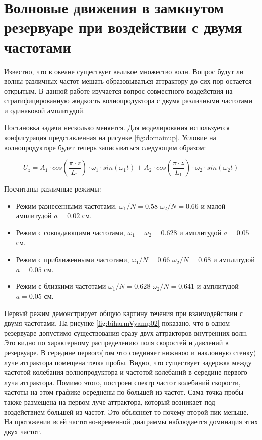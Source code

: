 \section{Волновые движения в замкнутом резервуаре при воздействии с двумя частотами}

Известно, что в океане существует великое множество волн. Вопрос будут ли волны различных частот мешать образовываться аттрактору до сих пор остается открытым. В данной работе изучается вопрос совместного воздействия на стратифицированную жидкость волнопродуктора с двумя различными частотами и одинаковой амплитудой. 

Постановка задачи несколько меняется. Для моделирования используется конфигурация представленная на рисунке \ref{fig:domainup}. Условие на волнопродукторе будет теперь записываться следующим образом:

\begin{equation}
    U_z = A_1\cdot cos\left(\frac{\pi \cdot z}{L_1}\right)\cdot \omega_1 \cdot  sin(\omega_1 t) + A_2\cdot cos\left(\frac{\pi \cdot z}{L_1}\right)\cdot \omega_2 \cdot  sin(\omega_2 t)
\end{equation}

Посчитаны различные режимы:

\begin{itemize}
    \item Режим разнесенными частотами, $\omega_1/N=0.58$ $\omega_2/N=0.66$ и малой амплитудой $a=0.02$ см. 
    \item Режим с совпадающими частотами, $\omega_1=\omega_2=0.628$ и амплитудой $a=0.05$ см.
    \item Режим с приближенными частотами, $\omega_1/N=0.66$ $\omega_2/N=0.68$ и амплитудой $a=0.05$ см.
    \item Режим с близкими частотами $\omega_1/N=0.628$ $\omega_2/N=0.641$ и  амплитудой $a=0.05$ см.
\end{itemize}

Первый режим демонстрирует общую картину течения при взаимодействии с двумя частотами. На рисунке \ref{fig:biharmVyamp02} показано, что в одном резервуаре допустимо существования сразу двух аттракторов внутренних волн. Это видно по характерному распределению поля скоростей и давлений в резервуаре. В середине первого(том что соединяет нижнюю и наклонную стенку) луче аттрактора помещена точка пробы. Видно, что существует задержка между частотой колебания волнопродуктора и частотой колебаний в середине первого луча аттрактора. Помимо этого, построен спектр частот колебаний скорости, частоты на этом графике осреднены по большей из частот. Сама точка пробы также размещена на первом луче аттрактора, который возникает под воздействием большей из частот. Это объясняет то почему второй пик меньше. На протяжении всей частотно-временной диаграммы наблюдается доминация этих двух частот.

